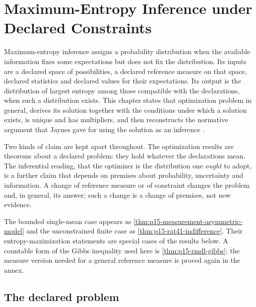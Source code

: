\chapter{Maximum-Entropy Inference under Declared Constraints}
\label{sec:p15-w02b-p15-043-maxent}

Maximum-entropy inference assigns a probability distribution when the
available information fixes some expectations but does not fix the
distribution. Its inputs are a declared space of possibilities, a declared
reference measure on that space, declared statistics and declared values
for their expectations. Its output is the distribution of largest entropy
among those compatible with the declarations, when such a distribution
exists. This chapter states that optimization problem in general, derives
its solution together with the conditions under which a solution exists,
is unique and has multipliers, and then reconstructs the normative argument
that Jaynes gave for using the solution as an inference
\cite[pp.~620--623, 630]{Jaynes1957InformationTheory}.

Two kinds of claim are kept apart throughout. The optimization results are
theorems about a declared problem: they hold whatever the declarations
mean. The inferential reading, that the optimizer is the distribution one
\emph{ought} to adopt, is a further claim that depends on premises about
probability, uncertainty and information. A change of reference measure or
of constraint changes the problem and, in general, its answer; such a change
is a change of premises, not new evidence.

The bounded single-mean case appears as
\cref{thm:p15-measurement-asymmetric-model} and the unconstrained finite
case as \cref{thm:p15-rat41-indifference}. Their entropy-maximization
statements are special cases of the results below. A countable form of the Gibbs inequality used here is
\cref{thm:p15-rmdl-gibbs}; the measure version needed for a general
reference measure is proved again in the annex.

\section{The declared problem}
\label{sec:p15-w02b-p15-043-problem}

